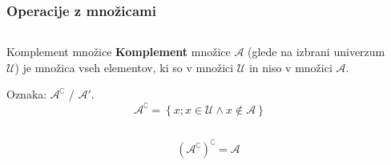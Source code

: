         \begin{frame}
            \frametitle{Operacije z množicami}

            \begin{columns}[T]
                    \begin{alertblock}{Komplement množice}
                        \textbf{Komplement} množice $\mathcal{A}$ (glede na izbrani univerzum $\mathcal{U}$) je množica 
                        vseh elementov, ki so v množici $\mathcal{U}$ in niso v množici $\mathcal{A}$.

                        Oznaka: $\mathbf{\mathcal{A}^\complement}$ / $\mathbf{\mathcal{A}'}$.      
                        $$ \mathcal{A}^\complement=\left\{ x; x\in\mathcal{U}\land x\notin\mathcal{A}\right\} $$           
                    \end{alertblock}

                    \begin{block}{}
                    \end{block}

            \end{columns}

            \begin{block}{}
                $$\left( \mathcal{A}^\complement\right)^\complement=\mathcal{A} $$
            \end{block}
                


        \end{frame}


